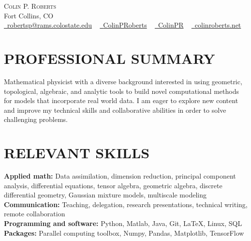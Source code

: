 \documentclass[letterpaper,11pt]{article}
\newcommand{\accentcolor}[1]{\textcolor{accentcolor}{#1}}
\begin{document}


\begin{center}
    {\Huge \scshape Colin P. Roberts} \\ \vspace{1pt}
    Fort Collins, CO \\ \vspace{1pt}
    \href{mailto:robertsp@rams.colostate.edu}{\faEnvelope \ \accentcolor{robertsp@rams.colostate.edu}} ~
    \href{https://www.linkedin.com/in/colinproberts/}{\faLinkedinSquare \ \accentcolor{ColinPRoberts}}  ~
    \href{https://github.com/ColinPR}{\faGithub \ \accentcolor{ColinPR}} ~
    \href{https://www.colinroberts.net}{\faGreaterThan \ \accentcolor{colinroberts.net}}
\end{center}

\vspace*{-10pt}
\section{PROFESSIONAL SUMMARY}
    Mathematical physicist with a diverse background interested in using geometric, topological, algebraic, and analytic tools to build novel computational methods for models that incorporate real world data. I am eager to explore new content and improve my technical skills and collaborative abilities in order to solve challenging problems. 
 \vspace{-5pt}
\section{RELEVANT SKILLS}
 \begin{itemize}[leftmargin=0in, label={}]
    \small{\item{

     \textbf{\normalsize{Applied math:}}{ \normalsize{Data assimilation, dimension reduction, principal component analysis, differential equations, tensor algebra, geometric algebra, discrete differential geometry, Gaussian mixture models, multiscale modeling}} \\
     \textbf{\normalsize{Communication:}}{ \normalsize{Teaching, delegation, research presentations, technical writing, remote collaboration}} \\
     \textbf{\normalsize{Programming and software:}}{ \normalsize{Python, Matlab, Java, Git, \LaTeX, Linux, SQL}} \\
     \textbf{\normalsize{Packages:}}{ \normalsize{Parallel computing toolbox, Numpy, Pandas, Matplotlib, TensorFlow}} \\	
	}}
 \end{itemize}
 \vspace{-25pt}
\end{document}
